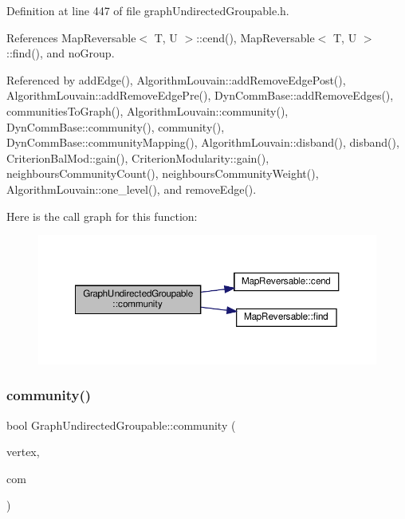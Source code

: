 Definition at line 447 of file graph\+Undirected\+Groupable.\+h.



References Map\+Reversable$<$ T, U $>$\+::cend(), Map\+Reversable$<$ T, U $>$\+::find(), and no\+Group.



Referenced by add\+Edge(), Algorithm\+Louvain\+::add\+Remove\+Edge\+Post(), Algorithm\+Louvain\+::add\+Remove\+Edge\+Pre(), Dyn\+Comm\+Base\+::add\+Remove\+Edges(), communities\+To\+Graph(), Algorithm\+Louvain\+::community(), Dyn\+Comm\+Base\+::community(), community(), Dyn\+Comm\+Base\+::community\+Mapping(), Algorithm\+Louvain\+::disband(), disband(), Criterion\+Bal\+Mod\+::gain(), Criterion\+Modularity\+::gain(), neighbours\+Community\+Count(), neighbours\+Community\+Weight(), Algorithm\+Louvain\+::one\+\_\+level(), and remove\+Edge().

Here is the call graph for this function\+:
\nopagebreak
\begin{figure}[H]
\begin{center}
\leavevmode
\includegraphics[width=350pt]{classGraphUndirectedGroupable_ad40474d566b3f9fbe9d132fbbe562ed5_cgraph}
\end{center}
\end{figure}
\mbox{\label{classGraphUndirectedGroupable_a7a9642a50ac522d9020afb9df211702f}} 
\subsubsection{\texorpdfstring{community()}{community()}\hspace{0.1cm}{\footnotesize\ttfamily [2/2]}}
{\footnotesize\ttfamily bool Graph\+Undirected\+Groupable\+::community (\begin{DoxyParamCaption}\item[{const \hyperlink{edge_8h_a5fbd20c46956d479cb10afc9855223f6}{type\+Vertex} \&}]{vertex,  }\item[{const \hyperlink{graphUndirectedGroupable_8h_a914da95c9ea7f14f4b7f875c36818556}{type\+Community} \&}]{com }\end{DoxyParamCaption})\hspace{0.3cm}{\ttfamily [inline]}}

